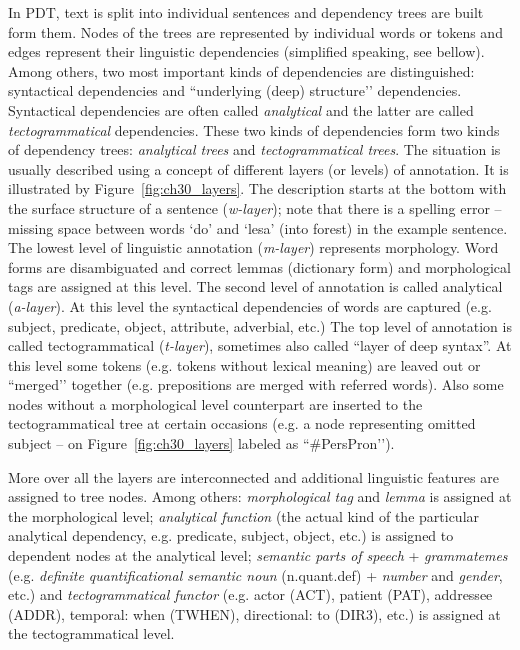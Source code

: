 In PDT, text is split into individual sentences and dependency trees are built form them. Nodes of the trees are represented by individual words or tokens and edges represent their linguistic dependencies (simplified speaking, see bellow). Among others, two most important kinds of dependencies are distinguished: syntactical dependencies and ``underlying (deep) structure’’ dependencies. Syntactical dependencies are often called \emph{analytical} and the latter are called \emph{tectogrammatical} dependencies. These two kinds of dependencies form two kinds of dependency trees: \emph{analytical trees} and \emph{tectogrammatical trees}. The situation is usually described using a concept of different layers (or levels) of annotation. It is illustrated by Figure~\ref{fig:ch30_layers}. The description starts at the bottom with the surface structure of a sentence (\emph{w-layer}); note that there is a spelling error -- missing space between words `do’ and `lesa’ (into forest) in the example sentence. The lowest level of linguistic annotation (\emph{m-layer}) represents morphology. Word forms are disambiguated and correct lemmas (dictionary form) and morphological tags are assigned at this level. The second level of annotation is called analytical (\emph{a-layer}). At this level the syntactical dependencies of words are captured (e.g. subject, predicate, object, attribute, adverbial, etc.) The top level of annotation is called tectogrammatical (\emph{t-layer}), sometimes also called ``layer of deep syntax''. At this level some tokens (e.g. tokens without lexical meaning) are leaved out or ``merged’’ together (e.g. prepositions are merged with referred words). Also some nodes without a morphological level counterpart are inserted to the tectogrammatical tree at certain occasions (e.g. a node representing omitted subject -- on Figure~\ref{fig:ch30_layers} labeled as ``\#PersPron’’).  

More over all the layers are interconnected and additional linguistic features are assigned to tree nodes. Among others: \emph{morphological tag} and \emph{lemma} is assigned at the morphological level; \emph{analytical function} (the actual kind of the particular analytical dependency, e.g. predicate, subject, object, etc.) is assigned to dependent nodes at the analytical level; \emph{semantic parts of speech} + \emph{grammatemes} (e.g. \emph{definite quantificational semantic noun} (n.quant.def) + \emph{number} and \emph{gender}, etc.) and \emph{tectogrammatical functor} (e.g. actor (ACT), patient (PAT), addressee (ADDR), temporal: when (TWHEN), directional: to (DIR3), etc.) is assigned at the tectogrammatical level. 

